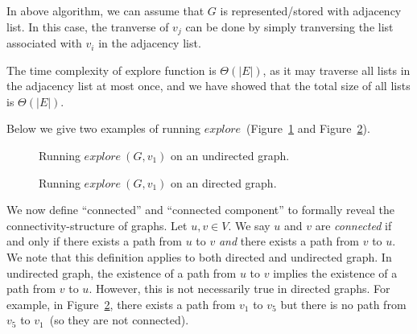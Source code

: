 \begin{minipage}{0.8\textwidth}
	\xxx
	\xxx
	\xxx
	\xxx
	\xxx
	\xxx
\end{minipage}

In above algorithm, we can assume that $G$ is represented/stored with adjacency list.
In this case, the tranverse of $v_j$ can be done by simply tranversing the list associated with $v_i$
in the adjacency list. 

The time complexity of explore function is $\Theta(|E|)$, as it may traverse
all lists in the adjacency list at most once, and we have showed that 
the total size of all lists is $\Theta(|E|)$.


Below we give two examples of running $explore$~(Figure~\ref{fig:explore-undirected} and Figure~\ref{fig:explore-directed}). 

\begin{figure}[h!]
\centering{}
\caption{Running $explore~(G, v_1)$ on an undirected graph.}
\label{fig:explore-undirected}
\end{figure}

\begin{figure}[h!]
\centering{}
\caption{Running $explore~(G, v_1)$ on an directed graph.}
\label{fig:explore-directed}
\end{figure}

We now define ``connected'' and ``connected component'' to formally reveal the connectivity-structure of graphs.
Let $u,v\in V$. We say $u$ and $v$ are \emph{connected} if and only if there exists a path from $u$ to $v$
\emph{and} there exists a path from $v$ to $u$. 
We note that this definition applies to both directed and undirected graph.
In undirected graph, the existence of a path from $u$ to $v$ implies the
existence of a path from $v$ to $u$. However, this is not necessarily true in directed
graphs. For example, in Figure~\ref{fig:explore-directed}, there exists a path from $v_1$ to $v_5$ but there is no path
from $v_5$ to $v_1$~(so they are not connected).

